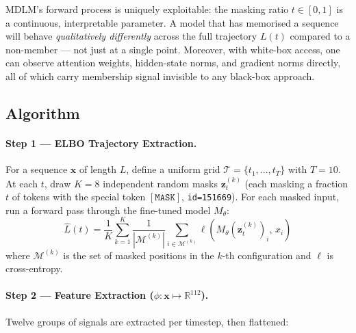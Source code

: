 \documentclass[11pt,a4paper]{article}
\begin{document}
MDLM's forward process is uniquely exploitable: the masking ratio $t \in [0,1]$
is a continuous, interpretable parameter.  A model that has memorised a
sequence will behave \emph{qualitatively differently} across the full trajectory
$L(t)$ compared to a non-member — not just at a single point.
Moreover, with white-box access, one can observe attention weights, hidden-state
norms, and gradient norms directly, all of which carry membership signal
invisible to any black-box approach.

\subsection{Algorithm}

\paragraph{Step 1 — ELBO Trajectory Extraction.}
For a sequence $\mathbf{x}$ of length $L$, define a uniform grid
$\mathcal{T} = \{t_1, \ldots, t_T\}$ with $T = 10$.
At each $t$, draw $K = 8$ independent random masks $\mathbf{z}_t^{(k)}$
(each masking a fraction $t$ of tokens with the special token $[\mathtt{MASK}]$,
\texttt{id=151669}).  For each masked input, run a forward pass through the
fine-tuned model $M_\theta$:
\[
  \hat{L}(t) = \frac{1}{K} \sum_{k=1}^{K}
  \frac{1}{|\mathcal{M}^{(k)}|}
  \sum_{i \in \mathcal{M}^{(k)}} \ell\!\left(M_\theta(\mathbf{z}_t^{(k)})_i,\, x_i\right)
\]
where $\mathcal{M}^{(k)}$ is the set of masked positions in the $k$-th
configuration and $\ell$ is cross-entropy.

\paragraph{Step 2 — Feature Extraction ($\phi: \mathbf{x} \mapsto \mathbb{R}^{112}$).}
Twelve groups of signals are extracted per timestep, then flattened:
\end{document}
